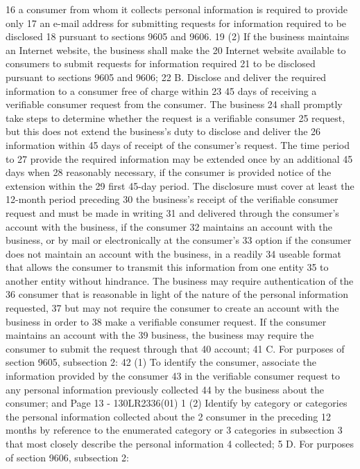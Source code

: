 16 a consumer from whom it collects personal information is required to provide only
17 an e-mail address for submitting requests for information required to be disclosed
18 pursuant to sections 9605 and 9606.
19 (2) If the business maintains an Internet website, the business shall make the
20 Internet website available to consumers to submit requests for information required
21 to be disclosed pursuant to sections 9605 and 9606;
22 B. Disclose and deliver the required information to a consumer free of charge within
23 45 days of receiving a verifiable consumer request from the consumer. The business
24 shall promptly take steps to determine whether the request is a verifiable consumer
25 request, but this does not extend the business's duty to disclose and deliver the
26 information within 45 days of receipt of the consumer's request. The time period to
27 provide the required information may be extended once by an additional 45 days when
28 reasonably necessary, if the consumer is provided notice of the extension within the
29 first 45-day period. The disclosure must cover at least the 12-month period preceding
30 the business's receipt of the verifiable consumer request and must be made in writing
31 and delivered through the consumer's account with the business, if the consumer
32 maintains an account with the business, or by mail or electronically at the consumer's
33 option if the consumer does not maintain an account with the business, in a readily
34 useable format that allows the consumer to transmit this information from one entity
35 to another entity without hindrance. The business may require authentication of the
36 consumer that is reasonable in light of the nature of the personal information requested,
37 but may not require the consumer to create an account with the business in order to
38 make a verifiable consumer request. If the consumer maintains an account with the
39 business, the business may require the consumer to submit the request through that
40 account;
41 C. For purposes of section 9605, subsection 2:
42 (1) To identify the consumer, associate the information provided by the consumer
43 in the verifiable consumer request to any personal information previously collected
44 by the business about the consumer; and
Page 13 - 130LR2336(01)
1 (2) Identify by category or categories the personal information collected about the
2 consumer in the preceding 12 months by reference to the enumerated category or
3 categories in subsection 3 that most closely describe the personal information
4 collected;
5 D. For purposes of section 9606, subsection 2:
